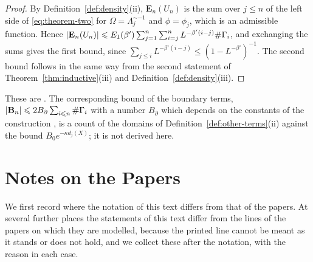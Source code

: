 \documentclass[11pt]{preprint}
\DeclarePairedDelimiter{\abs}{\lvert}{\rvert}
\numberwithin{equation}{section}
\begin{document}
\begin{proof}
By Definition~\ref{def:density}(ii), $\mathbf E_n(U_n)$ is the sum over $j \leqslant n$ of the left side of \eqref{eq:theorem-two} for $\Omega = \Lambda_j^{\sim-1}$ and $\phi = \phi_j$, which is an admissible function. Hence $\abs{\mathbf E_n(U_n)} \leqslant E_1(\beta')\sum_{j=1}^n\sum_{i=j}^nL^{-\beta'(i-j)}\#\Gamma_i$, and exchanging the sums gives the first bound, since $\sum_{j \leqslant i}L^{-\beta'(i-j)} \leqslant (1 - L^{-\beta'})^{-1}$. The second bound follows in the same way from the second statement of Theorem~\ref{thm:inductive}(iii) and Definition~\ref{def:density}(iii).
\end{proof}

These are \cite[(2.45), (2.46), p.~263]{BalabanCRE}. The corresponding bound of the boundary terms, $\abs{\mathbf B_n} \leqslant 2B_\partial\sum_{i \leqslant n}\#\Gamma_i$ with a number $B_\partial$ which depends on the constants of the construction \cite[(2.47), (2.48), p.~264]{BalabanCRE}, is a count of the domains of Definition~\ref{def:other-terms}(ii) against the bound $B_0e^{-\kappa d_j(X)}$; it is not derived here.

\section{Notes on the Papers}\label{sec:notes}

We first record where the notation of this text differs from that of the papers. At several further places the statements of this text differ from the lines of the papers on which they are modelled, because the printed line cannot be meant as it stands or does not hold, and we collect these after the notation, with the reason in each case.
\end{document}
